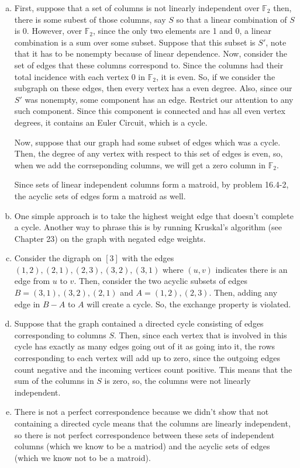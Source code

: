 \documentclass{article}
\begin{document}
\begin{enumerate}[a.]
\item
First, suppose that a set of columns is not linearly independent over $\mathbb{F}_2$ then, there is some subest of those columns, say $S$ so that a linear combination of $S$ is 0. However, over $\mathbb{F}_2$, since the only two elements are 1 and 0, a linear combination is a sum over some subset. Suppose that this subset is $S'$, note that it has to be nonempty because of linear dependence. Now, consider the set of edges that these columns correspond to. Since the columns had their total incidence with each vertex 0 in $\mathbb{F}_2$, it is even. So, if we consider the subgraph on these edges, then every vertex has a even degree. Also, since our $S'$ was nonempty, some component has an edge. Restrict our attention to any such component. Since this component is connected and has all even vertex degrees, it contains an Euler Circuit, which is a cycle.

Now, suppose that our graph had some subset of edges which was a cycle. Then, the degree of any vertex with respect to this set of edges is even, so, when we add the corrseponding columns, we will get a zero column in $\mathbb{F}_2$.

Since sets of linear independent columns form a matroid, by problem 16.4-2, the acyclic sets of edges form a matroid as well.
\item
One simple approach is to take the highest weight edge that doesn't complete a cycle. Another way to phrase this is by running Kruskal's algorithm (see Chapter 23) on the graph with negated edge weights.
\item
Consider the digraph on $[3]$ with the edges $(1,2),(2,1),(2,3),(3,2),(3,1)$ where $(u,v)$ indicates there is an edge from $u$ to $v$. Then, consider the two acyclic subsets of edges $B = (3,1),(3,2),(2,1)$ and $A = (1,2),(2,3)$. Then, adding any edge in $B-A$ to $A$ will create a cycle. So, the exchange property is violated.
\item
Suppose that the graph contained a directed cycle consisting of edges corresponding to columns $S$. Then, since each vertex that is involved in this cycle has exactly as many edges going out of it as going into it, the rows corresponding to each vertex will add up to zero, since the outgoing edges count negative and the incoming vertices count positive. This means that the sum of the columns in $S$ is zero, so, the columns were not linearly independent.


\item
There is not a perfect correspondence because we didn't show that not containing a directed cycle means that the columns are linearly independent, so there is not perfect correspondence between these sets of independent columns (which we know to be a matriod) and the acyclic sets of edges (which we know not to be a matroid).
\end{enumerate}
\end{document}
